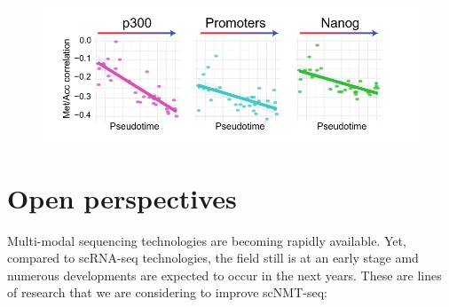 \begin{figure}[H]
	\centering
	\includegraphics[width=0.9\linewidth]{scNMT_pseudotime_coupling}
	\caption[]{}
	\label{fig:scnmt_pseudotime_coupling}
\end{figure}

\section{Open perspectives}

Multi-modal sequencing technologies are becoming rapidly available. Yet, compared to scRNA-seq technologies, the field still is at an early stage amd numerous developments are expected to occur in the next years. These are lines of research that we are considering to improve scNMT-seq:

